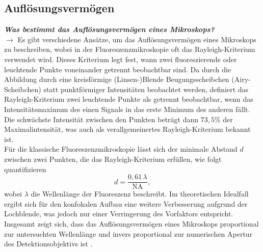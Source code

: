 \subsection{\label{subsec:FZV7}Auflösungsvermögen}
\textbf{\textit{Was bestimmt das Auflösungsvermögen eines Mikroskops?}} \\
$\rightarrow$
Es gibt verschiedene Ansätze, um das Auflösungsvermögen eines Mikroskops zu beschreiben, 
wobei in der Fluoreszenzmikroskopie oft das Rayleigh-Kriterium verwendet wird. 
Dieses Kriterium legt fest, wann zwei fluoreszierende oder leuchtende Punkte voneinander 
getrennt beobachtbar sind. Da durch die Abbildung durch eine kreisförmige (Linsen-)Blende 
Beugungsscheibchen (Airy-Scheibchen) statt punktförmiger Intensitäten beobachtet werden, 
definiert das Rayleigh-Kriterium zwei leuchtende Punkte als getrennt beobachtbar, 
wenn das Intensitätsmaximum des einen Signals in das erste Minimum des anderen fällt. 
Die schwächste Intensität zwischen den Punkten beträgt dann $73,5\%$ der Maximalintensität, 
was auch als verallgemeinertes Rayleigh-Kriterium bekannt ist. \\
Für die klassische Fluoreszenzmikroskopie lässt sich der minimale Abstand $d$ zwischen zwei Punkten, 
die das Rayleigh-Kriterium erfüllen, wie folgt quantifizieren
\begin{equation}\label{eq:aufl}
    d = \frac{0,61\,\lambda}{\text{NA}},
\end{equation}
wobei $\lambda$ die Wellenlänge der Fluoreszenz beschreibt. 
Im theoretischen Idealfall ergibt sich für den konfokalen Aufbau eine weitere 
Verbesserung aufgrund der Lochblende, was jedoch nur einer Verringerung des Vorfaktors entspricht. \\
Insgesamt zeigt sich, dass das Auflösungsvermögen eines Mikroskops proportional zur untersuchten 
Wellenlänge und invers proportional zur numerischen Apertur des Detektionsobjektivs ist \cite{Auf1, Auf2, Auf3}. \\ 